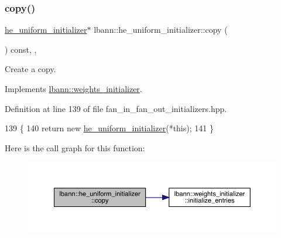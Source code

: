\subsubsection{\texorpdfstring{copy()}{copy()}}
{\footnotesize\ttfamily \hyperlink{classlbann_1_1he__uniform__initializer}{he\+\_\+uniform\+\_\+initializer}$\ast$ lbann\+::he\+\_\+uniform\+\_\+initializer\+::copy (\begin{DoxyParamCaption}{ }\end{DoxyParamCaption}) const\hspace{0.3cm}{\ttfamily [inline]}, {\ttfamily [override]}, {\ttfamily [virtual]}}

Create a copy. 

Implements \hyperlink{classlbann_1_1weights__initializer_acc84ce49188b74b23987cef3db18525a}{lbann\+::weights\+\_\+initializer}.



Definition at line 139 of file fan\+\_\+in\+\_\+fan\+\_\+out\+\_\+initializers.\+hpp.


\begin{DoxyCode}
139                                                 \{
140     \textcolor{keywordflow}{return} \textcolor{keyword}{new} \hyperlink{classlbann_1_1he__uniform__initializer_a17bc65cd69fbce240c2050c228a2682c}{he\_uniform\_initializer}(*\textcolor{keyword}{this});
141   \}
\end{DoxyCode}
Here is the call graph for this function\+:\nopagebreak
\begin{figure}[H]
\begin{center}
\leavevmode
\includegraphics[width=350pt]{classlbann_1_1he__uniform__initializer_a9860575b43f3d08831d00219bb07ec73_cgraph}
\end{center}
\end{figure}
\mbox{\label{classlbann_1_1he__uniform__initializer_a8f86401b0b216ba159f57d3475769a24}} 
